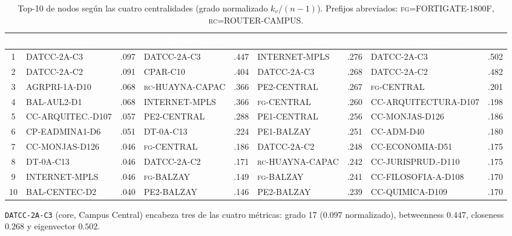 \documentclass[11pt, a4paper]{article}
\newcommand{\encabezado}[1]{%
    \cellcolor{tabhead}\textcolor{white}{\textbf{#1}}}
\begin{document}
\begin{table}[htbp]
\centering
\caption{Top-10 de nodos según las cuatro centralidades (grado normalizado
         $k_v/(n-1)$). Prefijos abreviados: \textsc{fg}=FORTIGATE-1800F,
         \textsc{rc}=ROUTER-CAMPUS.}
\label{tab:centralidades_top10}
\scriptsize
\setlength{\tabcolsep}{3pt}
\begin{tabular}{@{}c l r l r l r l r@{}}
    \toprule
    \encabezado{\#} &
    \multicolumn{2}{c}{\encabezado{Grado}} &
    \multicolumn{2}{c}{\encabezado{Betweenness}} &
    \multicolumn{2}{c}{\encabezado{Closeness}} &
    \multicolumn{2}{c}{\encabezado{Eigenvector}} \\
    \midrule
    \rowcolor{tabfila}
    1  & DATCC-2A-C3      & .097 & DATCC-2A-C3      & .447 & INTERNET-MPLS   & .276 & DATCC-2A-C3      & .502 \\
    2  & DATCC-2A-C2      & .091 & CPAR-C10         & .404 & DATCC-2A-C3     & .268 & DATCC-2A-C2      & .482 \\
    \rowcolor{tabfila}
    3  & AGRPRI-1A-D10    & .068 & \textsc{rc}-HUAYNA-CAPAC & .366 & PE2-CENTRAL     & .267 & \textsc{fg}-CENTRAL & .201 \\
    4  & BAL-AUL2-D1      & .068 & INTERNET-MPLS    & .366 & \textsc{fg}-CENTRAL & .260 & CC-ARQUITECTURA-D107 & .198 \\
    \rowcolor{tabfila}
    5  & CC-ARQUITEC.-D107 & .057 & PE2-CENTRAL     & .288 & PE1-CENTRAL     & .256 & CC-MONJAS-D126   & .186 \\
    6  & CP-EADMINA1-D6   & .051 & DT-0A-C13        & .224 & PE1-BALZAY      & .251 & CC-ADM-D40       & .180 \\
    \rowcolor{tabfila}
    7  & CC-MONJAS-D126   & .046 & \textsc{fg}-CENTRAL & .186 & DATCC-2A-C2  & .248 & CC-ECONOMIA-D51  & .175 \\
    8  & DT-0A-C13        & .046 & DATCC-2A-C2      & .171 & \textsc{rc}-HUAYNA-CAPAC & .242 & CC-JURISPRUD.-D110 & .175 \\
    \rowcolor{tabfila}
    9  & INTERNET-MPLS    & .046 & \textsc{fg}-BALZAY & .149 & \textsc{fg}-BALZAY & .241 & CC-FILOSOFIA-A-D108 & .170 \\
    10 & BAL-CENTEC-D2    & .040 & PE2-BALZAY       & .146 & PE2-BALZAY      & .239 & CC-QUIMICA-D109  & .170 \\
    \bottomrule
\end{tabular}
\end{table}

\texttt{DATCC-2A-C3} (core, Campus Central) encabeza tres de las cuatro
métricas: grado 17 ($0.097$ normalizado), betweenness $0.447$, closeness
$0.268$ y eigenvector $0.502$.
\end{document}
